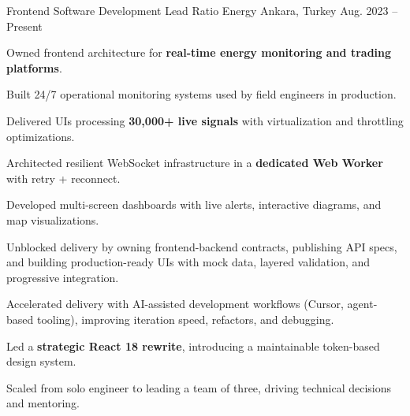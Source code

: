 
\begin{cventries}

\cventry
  {Frontend Software Development Lead}
  {Ratio Energy}
  {Ankara, Turkey}
  {Aug. 2023 -- Present}
  {
    \begin{cvitems}
      \item {Owned frontend architecture for \textbf{real-time energy monitoring and trading platforms}.}
      \item {Built 24/7 operational monitoring systems used by field engineers in production.}
      \item {Delivered UIs processing \textbf{30,000+ live signals} with virtualization and throttling optimizations.}
      \item {Architected resilient WebSocket infrastructure in a \textbf{dedicated Web Worker} with retry + reconnect.}
      \item {Developed multi-screen dashboards with live alerts, interactive diagrams, and map visualizations.}
      \item {Unblocked delivery by owning frontend-backend contracts, publishing API specs, and building production-ready UIs with mock data, layered validation, and progressive integration.}
      \item {Accelerated delivery with AI-assisted development workflows (Cursor, agent-based tooling), improving iteration speed, refactors, and debugging.}
      \item {Led a \textbf{strategic React 18 rewrite}, introducing a maintainable token-based design system.}
      \item {Scaled from solo engineer to leading a team of three, driving technical decisions and mentoring.}
    \end{cvitems}
  }


\end{cventries}
